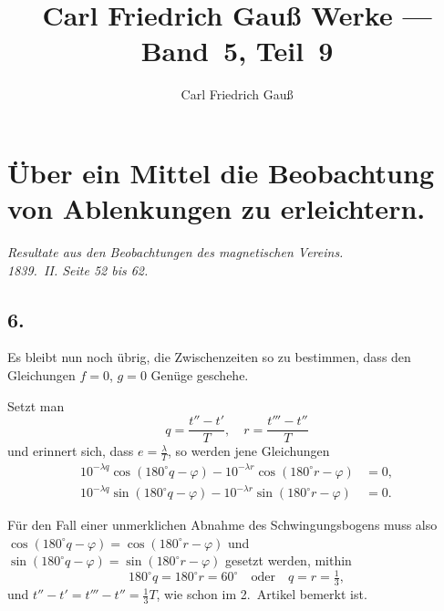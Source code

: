 \documentclass[12pt,a4paper]{article}
\begin{document}
\title{Carl Friedrich Gauß Werke --- Band~5, Teil~9}
\author{Carl Friedrich Gauß}
\date{}
\maketitle

\thispagestyle{empty}

\tableofcontents
\newpage

\section*{Über ein Mittel die Beobachtung von Ablenkungen zu erleichtern.}

\begin{center}
\textit{Resultate aus den Beobachtungen des magnetischen Vereins.}\\
\textit{1839.~II. Seite 52 bis 62.}
\end{center}

\setcounter{subsection}{5}
\subsection*{6.}

Es bleibt nun noch übrig, die Zwischenzeiten so zu bestimmen, dass den Gleichungen $f = 0$, $g = 0$ Genüge geschehe.

Setzt man
\begin{equation}
q = \frac{t'' - t'}{T},\quad r = \frac{t''' - t''}{T}
\end{equation}
und erinnert sich, dass $e = \frac{\lambda}{T}$, so werden jene Gleichungen
\begin{align}
10^{-\lambda q}\cos(180^{\circ}q - \varphi) - 10^{-\lambda r}\cos(180^{\circ}r - \varphi) &= 0,\\
10^{-\lambda q}\sin(180^{\circ}q - \varphi) - 10^{-\lambda r}\sin(180^{\circ}r - \varphi) &= 0.
\end{align}

Für den Fall einer unmerklichen Abnahme des Schwingungsbogens muss also $\cos(180^{\circ}q - \varphi) = \cos(180^{\circ}r - \varphi)$ und $\sin(180^{\circ}q - \varphi) = \sin(180^{\circ}r - \varphi)$ gesetzt werden, mithin
\begin{equation}
180^{\circ}q = 180^{\circ}r = 60^{\circ}\quad \text{oder}\quad q = r = \tfrac{1}{3},
\end{equation}
und $t'' - t' = t''' - t'' = \tfrac{1}{3}T$, wie schon im 2.~Artikel bemerkt ist.
\end{document}
